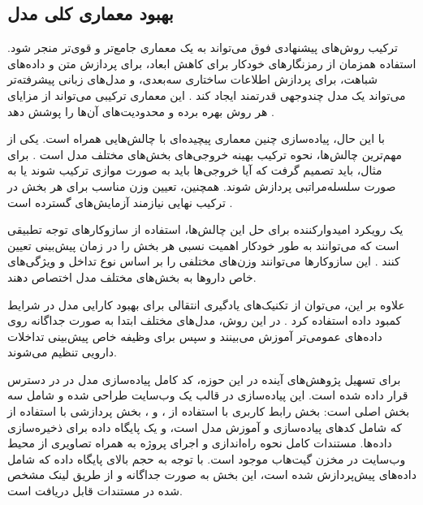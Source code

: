 \subsection{بهبود معماری کلی مدل}

ترکیب روش‌های پیشنهادی فوق می‌تواند به یک معماری جامع‌تر و قوی‌تر منجر شود. استفاده همزمان از رمزنگارهای خودکار برای کاهش ابعاد،  برای پردازش متن و داده‌های شباهت،  برای پردازش اطلاعات ساختاری سه‌بعدی، و مدل‌های زبانی پیشرفته‌تر می‌تواند یک مدل چندوجهی قدرتمند ایجاد کند \cite{ref_shi2024}. این معماری ترکیبی می‌تواند از مزایای هر روش بهره برده و محدودیت‌های آن‌ها را پوشش دهد \cite{ref_he2023}.

با این حال، پیاده‌سازی چنین معماری پیچیده‌ای با چالش‌هایی همراه است. یکی از مهم‌ترین چالش‌ها، نحوه ترکیب بهینه خروجی‌های بخش‌های مختلف مدل است \cite{ref_dai2020}. برای مثال، باید تصمیم گرفت که آیا خروجی‌ها باید به صورت موازی ترکیب شوند یا به صورت سلسله‌مراتبی پردازش شوند. همچنین، تعیین وزن مناسب برای هر بخش در ترکیب نهایی نیازمند آزمایش‌های گسترده است \cite{ref_yang2022}.

یک رویکرد امیدوارکننده برای حل این چالش‌ها، استفاده از سازوکار‌های توجه تطبیقی است که می‌توانند به طور خودکار اهمیت نسبی هر بخش را در زمان پیش‌بینی تعیین کنند \cite{ref_lin2022}. این سازوکار‌ها می‌توانند وزن‌های مختلفی را بر اساس نوع تداخل و ویژگی‌های خاص داروها به بخش‌های مختلف مدل اختصاص دهند.

علاوه بر این، می‌توان از تکنیک‌های یادگیری انتقالی برای بهبود کارایی مدل در شرایط کمبود داده استفاده کرد \cite{ref_deng2020}. در این روش، مدل‌های مختلف ابتدا به صورت جداگانه روی داده‌های عمومی‌تر آموزش می‌بینند و سپس برای وظیفه خاص پیش‌بینی تداخلات دارویی تنظیم می‌شوند.

\vspace{1cm}

برای تسهیل پژوهش‌های آینده در این حوزه، کد کامل پیاده‌سازی مدل در \cite{ref_github} در دسترس قرار داده شده است. این پیاده‌سازی در قالب یک وب‌سایت طراحی شده و شامل سه بخش اصلی است: بخش رابط کاربری با استفاده از ،  و ، بخش پردازشی با استفاده از  که شامل کدهای پیاده‌سازی و آموزش مدل است، و یک پایگاه داده  برای ذخیره‌سازی داده‌ها. مستندات کامل نحوه راه‌اندازی و اجرای پروژه به همراه تصاویری از محیط وب‌سایت در مخزن گیت‌هاب موجود است. با توجه به حجم بالای پایگاه داده که شامل داده‌های پیش‌پردازش شده است، این بخش به صورت جداگانه و از طریق لینک مشخص شده در مستندات قابل دریافت است.
